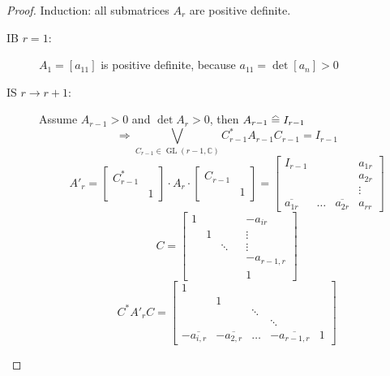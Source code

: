 \documentclass[a4paper,landscape,twocolumn]{article}
\newcommand\equalhat{\mathrel{\stackon[1.5pt]{=}{\stretchto{%
    \scalerel*[\widthof{=}]{\wedge}{\rule{1ex}{3ex}}}{0.5ex}}}}
\begin{document}
\begin{proof}
  Induction: all submatrices $A_r$ are positive definite.
  \begin{description}
    \item[IB $r=1$:]
      $A_1 = [a_{11}]$ is positive definite, because $a_{11} = \det[a_n] > 0$
    \item[IS $r\to r+1$:]
      Assume $A_{r-1} > 0$ and $\det{A_r} > 0$, then $A_{r-1} \equalhat I_{r-1}$
      \[ \Rightarrow \bigvee_{C_{r-1} \in \operatorname{GL}(r-1,\mathbb C)} C^*_{r-1} A_{r-1} C_{r-1} = I_{r-1} \]
      \[
        A'_r = \begin{bmatrix}
          C^*_{r-1} & \\
                    & 1
        \end{bmatrix}
        \cdot
        A_r
        \cdot
        \begin{bmatrix}
          C_{r-1} & \\
                  & 1
        \end{bmatrix}
        = \begin{bmatrix}
          I_{r-1}           &        &                   & a_{1r} \\
                            &        &                   & a_{2r} \\
                            &        &                   & \vdots \\
          \overline{a_{1r}} & \ldots & \overline{a_{2r}} & a_{rr}
        \end{bmatrix}
      \] \[
        C = \begin{bmatrix}
          1 &   &    &    & -a_{ir} \\
            & 1 &    &    & \vdots \\
            &   & \ddots & & \vdots \\
            &   &        & & -a_{r-1,r} \\
            &   &        & & 1
        \end{bmatrix}
      \] \[
        C^* A'_r C = \begin{bmatrix}
          1 &   &        &      &      \\
            & 1 &        &      &      \\
            &   & \ddots &      &      \\
            &   &        & \ddots &      \\
          -\overline{a_{i,r}} & -\overline{a_{2,r}} & \ldots & -\overline{a_{r-1,r}} & 1
        \end{bmatrix}
\]
\end{description}
\end{proof}
\end{document}
